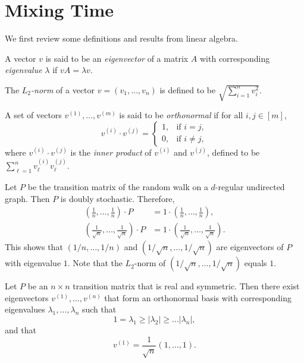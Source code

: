 \documentclass[letterpaper, reqno,11pt]{article}
\begin{document}
\section{Mixing Time}

We first review some definitions and results from linear algebra.

\begin{definition}
  A vector $v$ is said to be an \emph{eigenvector} of a matrix $A$ with corresponding \emph{eigenvalue} $\lambda$ if $vA = \lambda v$.
\end{definition}

\begin{definition}
  The \emph{$L_2$-norm} of a vector $v = (v_1, \ldots, v_n)$ is defined to be $\sqrt{\sum_{i = 1}^n v_i^2}$.
\end{definition}

\begin{definition}
  A set of vectors $v^{(1)}, \ldots, v^{(m)}$ is said to be \emph{orthonormal} if for all $i, j \in [m]$,
  $$ v^{(i)} \cdot v^{(j)} = \left\{
    \begin{array}{ll}
      1, & \text{if $i = j$}, \\
      0, & \text{if $i \neq j$},
    \end{array}
  \right. $$
  where $v^{(i)} \cdot v^{(j)}$ is the \emph{inner product} of $v^{(i)}$ and $v^{(j)}$, defined to be $\sum_{\ell = 1}^n v_\ell^{(i)} v_\ell^{(j)}$.
\end{definition}

Let $P$ be the transition matrix of the random walk on a $d$-regular undirected graph. Then $P$ is doubly stochastic. Therefore,
\begin{align*}
  \left(\frac{1}{n}, \ldots, \frac{1}{n}\right) \cdot P &= 1 \cdot \left(\frac{1}{n}, \ldots, \frac{1}{n}\right), \\
  \left(\frac{1}{\sqrt{n}}, \ldots, \frac{1}{\sqrt{n}}\right) \cdot P &= 1 \cdot \left(\frac{1}{\sqrt{n}}, \ldots, \frac{1}{\sqrt{n}}\right).
\end{align*}
This shows that $(1/n, \ldots, 1/n)$ and $(1/\sqrt{n}, \ldots, 1/\sqrt{n})$ are eigenvectors of $P$ with eigenvalue $1$. Note that the $L_2$-norm of $(1/\sqrt{n}, \ldots, 1/\sqrt{n})$ equals $1$.

\begin{theorem}
  Let $P$ be an $n \times n$ transition matrix that is real and symmetric. Then there exist eigenvectors $v^{(1)}, \ldots, v^{(n)}$ that form an orthonormal basis with corresponding eigenvalues $\lambda_1, \ldots, \lambda_n$ such that
  $$ 1 = \lambda_1 \geq \left|\lambda_2\right| \geq \ldots \left|\lambda_n\right|, $$
  and that
  $$ v^{(1)} = \frac{1}{\sqrt{n}}(1, \ldots, 1). $$
\end{theorem}
\end{document}
